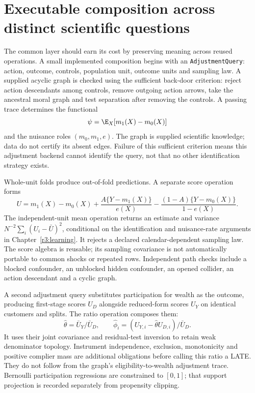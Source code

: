 \section{Executable composition across distinct scientific questions}
\label{s5:composition}
The common layer should earn its cost by preserving meaning across reused
operations. A small implemented composition begins with an
\texttt{AdjustmentQuery}: action, outcome, controls, population unit,
outcome units and sampling law. A supplied acyclic graph is checked using
the sufficient back-door criterion: reject action descendants among controls,
remove outgoing action arrows, take the ancestral moral graph and test
separation after removing the controls. A passing trace determines the
functional
\[
 \psi=\E_X[m_1(X)-m_0(X)]
\]
and the nuisance roles $(m_0,m_1,e)$. The graph is supplied scientific
knowledge; data do not certify its absent edges. Failure of this sufficient
criterion means this adjustment backend cannot identify the query, not that
no other identification strategy exists.

Whole-unit folds produce out-of-fold predictions. A separate score operation
forms
\[
 U=m_1(X)-m_0(X)+\frac{A\{Y-m_1(X)\}}{e(X)}
 -\frac{(1-A)\{Y-m_0(X)\}}{1-e(X)}.
\]
The independent-unit mean operation returns an estimate and variance
$N^{-2}\sum_i(U_i-\bar U)^2$, conditional on the identification and
nuisance-rate arguments in Chapter~\ref{r3:learning}. It rejects a declared
calendar-dependent sampling law. The score algebra is reusable; its sampling
covariance is not automatically portable to common shocks or repeated rows.
Independent path checks include a blocked confounder, an unblocked hidden
confounder, an opened collider, an action descendant and a cyclic graph.

A second adjustment query substitutes participation for wealth as the
outcome, producing first-stage scores $U_D$ alongside reduced-form scores
$U_Y$ on identical customers and splits. The ratio operation composes them:
\[
 \hat\theta=\bar U_Y/\bar U_D,
 \qquad \hat\phi_i=(U_{Y,i}-\hat\theta U_{D,i})/\bar U_D.
\]
It uses their joint covariance and residual-test inversion to retain weak
denominator topology. Instrument independence, exclusion, monotonicity and
positive complier mass are additional obligations before calling this ratio
a LATE. They do not follow from the graph's eligibility-to-wealth adjustment
trace. Bernoulli participation regressions are constrained to $[0,1]$;
that support projection is recorded separately from propensity clipping.

